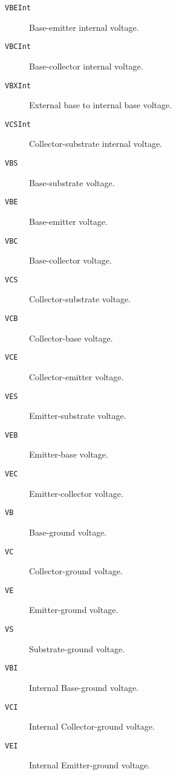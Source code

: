 \begin{description}

\item[{\tt VBEInt}] Base-emitter internal voltage.

\item[{\tt VBCInt}] Base-collector internal voltage.

\item[{\tt VBXInt}] External base to internal base voltage.

\item[{\tt VCSInt}] Collector-substrate internal voltage.

\item[{\tt VBS}] Base-substrate voltage.

\item[{\tt VBE}] Base-emitter voltage.

\item[{\tt VBC}] Base-collector voltage.

\item[{\tt VCS}] Collector-substrate voltage.

\item[{\tt VCB}] Collector-base voltage.

\item[{\tt VCE}] Collector-emitter voltage.

\item[{\tt VES}] Emitter-substrate voltage.

\item[{\tt VEB}] Emitter-base voltage.

\item[{\tt VEC}] Emitter-collector voltage.

\item[{\tt VB}] Base-ground voltage.

\item[{\tt VC}] Collector-ground voltage.

\item[{\tt VE}] Emitter-ground voltage.

\item[{\tt VS}] Substrate-ground voltage.

\item[{\tt VBI}] Internal Base-ground voltage.

\item[{\tt VCI}] Internal Collector-ground voltage.

\item[{\tt VEI}] Internal Emitter-ground voltage.


\end{description}
